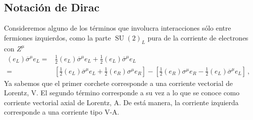 \subsection{Notación de Dirac}
Consideremos alguno de los términos que involucra interacciones sólo entre fermiones izquierdos, como la parte $\operatorname{SU}(2)_L$ pura de la corriente de electrones con $Z^{\mu}$
\begin{align}
  \left( e_L \right) \overline{\sigma}^{\mu} e_L =& \tfrac{1}{2}\left( e_L \right) \overline{\sigma}^{\mu} e_L+ \tfrac{1}{2}\left( e_L \right) \overline{\sigma}^{\mu} e_L \nonumber\\
  =& \left[  \tfrac{1}{2}\left( e_L \right) \overline{\sigma}^{\mu} e_L+ \tfrac{1}{2}\left( e_R \right){\sigma}^{\mu} e_R\right] - \left[\tfrac{1}{2}\left( e_R \right){\sigma}^{\mu} e_R-\tfrac{1}{2}\left( e_L \right) \overline{\sigma}^{\mu} e_L
      \right]\,,
\end{align}
Ya sabemos que el primer corchete corresponde a una corriente vectorial de Lorentz, $\text{V}$. El segundo término corresponde a su vez a lo que
se conoce como corriente vectorial axial de Lorentz, $\text{A}$. De está manera, la corriente izquierda corresponde a una corriente tipo $\text{V-A}$. 

